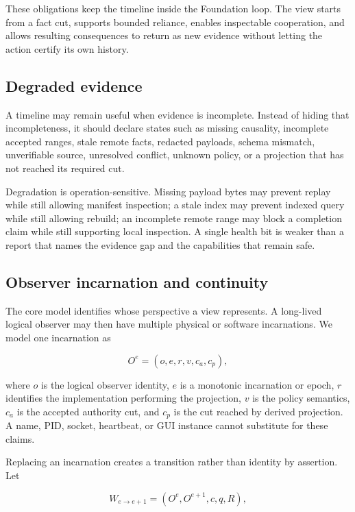 These obligations keep the timeline inside the Foundation loop. The view starts
from a fact cut, supports bounded reliance, enables inspectable cooperation,
and allows resulting consequences to return as new evidence without letting the
action certify its own history.

\subsection{Degraded evidence}

A timeline may remain useful when evidence is incomplete. Instead of hiding
that incompleteness, it should declare states such as missing causality,
incomplete accepted ranges, stale remote facts, redacted payloads, schema
mismatch, unverifiable source, unresolved conflict, unknown policy, or a
projection that has not reached its required cut.

Degradation is operation-sensitive. Missing payload bytes may prevent replay
while still allowing manifest inspection; a stale index may prevent indexed
query while still allowing rebuild; an incomplete remote range may block a
completion claim while still supporting local inspection. A single health bit
is weaker than a report that names the evidence gap and the capabilities that
remain safe.

\subsection{Observer incarnation and continuity}

The core model identifies whose perspective a view represents. A long-lived
logical observer may then have multiple physical or software incarnations. We
model one incarnation as

\begin{equation}
O^e = (o, e, r, v, c_a, c_p),
\end{equation}

where $o$ is the logical observer identity, $e$ is a monotonic incarnation or
epoch, $r$ identifies the implementation performing the projection, $v$ is the
policy semantics, $c_a$ is the accepted authority cut, and $c_p$ is the cut
reached by derived projection. A name, PID, socket, heartbeat, or GUI instance
cannot substitute for these claims.

Replacing an incarnation creates a transition rather than identity by
assertion. Let

\begin{equation}
W_{e \rightarrow e+1} = (O^e, O^{e+1}, c, q, R),
\end{equation}

